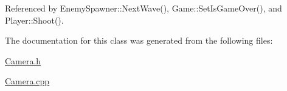 Referenced by Enemy\-Spawner\-::\-Next\-Wave(), Game\-::\-Set\-Is\-Game\-Over(), and Player\-::\-Shoot().



The documentation for this class was generated from the following files\-:\begin{DoxyCompactItemize}
\item 
\hyperlink{_camera_8h}{Camera.\-h}\item 
\hyperlink{_camera_8cpp}{Camera.\-cpp}\end{DoxyCompactItemize}
